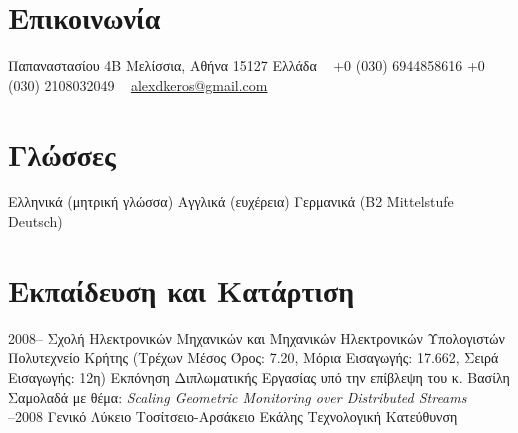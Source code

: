 \documentclass[print]{keros-cv} %
\begin{document}


\begin{aside} %
\section{Επικοινωνία}
Παπαναστασίου 4Β
Μελίσσια, Αθήνα 15127
Ελλάδα
~
+0 (030) 6944858616
+0 (030) 2108032049
~
\href{mailto:alexdkeros@gmail.com}{alexdkeros@gmail.com}
\section{Γλώσσες}
Ελληνικά (μητρική γλώσσα)
Αγγλικά (ευχέρεια)
Γερμανικά (B2 Mittelstufe Deutsch)
\end{aside}


\section{Εκπαίδευση και Κατάρτιση}

\begin{entrylist}
\entry
{2008-- }
{Σχολή Ηλεκτρονικών Μηχανικών και Μηχανικών Ηλεκτρονικών Υπολογιστών}
{Πολυτεχνείο Κρήτης}
{(Τρέχων Μέσος Όρος: 7.20, Μόρια Εισαγωγής: 17.662, Σειρά Εισαγωγής: 12η)
Εκπόνηση Διπλωματικής Εργασίας υπό την επίβλεψη του κ. Βασίλη Σαμολαδά με θέμα: \emph{Scaling Geometric Monitoring over Distributed Streams}\\}
\entry
{--2008}
{Γενικό Λύκειο}
{Τοσίτσειο-Αρσάκειο Εκάλης}
{Τεχνολογική Κατεύθυνση}
\end{entrylist}

\end{document}
